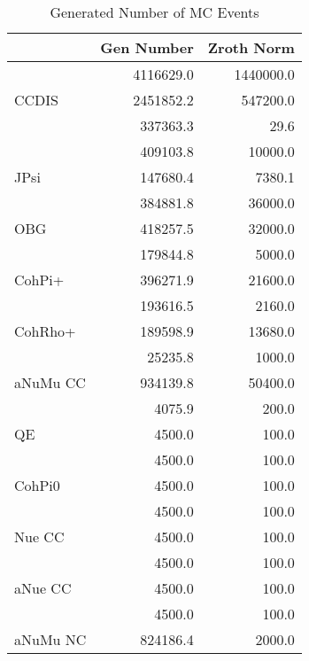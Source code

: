  \begin{table}[h!]\centering
 {\large{
 \begin{tabular}{||l|r|r||}
 \hline
 \hline
       & Gen Number   & Zroth Norm  \\
 \hline
           &  4116629.0 &  1440000.0 \\
 CCDIS     &  2451852.2 &   547200.0 \\
           &   337363.3 &       29.6 \\
           &   409103.8 &    10000.0 \\
 JPsi      &   147680.4 &     7380.1 \\
           &   384881.8 &    36000.0 \\
 OBG       &   418257.5 &    32000.0 \\
           &   179844.8 &     5000.0 \\
 CohPi+    &   396271.9 &    21600.0 \\
           &   193616.5 &     2160.0 \\
 CohRho+   &   189598.9 &    13680.0 \\
           &    25235.8 &     1000.0 \\
 aNuMu CC  &   934139.8 &    50400.0 \\
           &     4075.9 &      200.0 \\
 QE        &     4500.0 &      100.0 \\
           &     4500.0 &      100.0 \\
 CohPi0    &     4500.0 &      100.0 \\
           &     4500.0 &      100.0 \\
  Nue CC   &     4500.0 &      100.0 \\
           &     4500.0 &      100.0 \\
 aNue CC   &     4500.0 &      100.0 \\
           &     4500.0 &      100.0 \\
 aNuMu NC  &   824186.4 &     2000.0 \\
 \hline
 \hline
 \end{tabular}
 \caption{Generated Number of MC Events}
 \label{tab-gen-numbers}
 }}
 \end{table}
 \endinput
